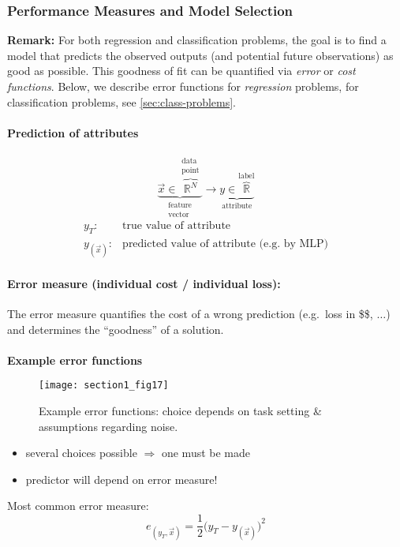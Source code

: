 \subsubsection{Performance Measures and Model
  Selection} \label{sec:perf-meas-model} \textbf{Remark:} For both
regression and classification problems, the goal is to find a model
that predicts the observed outputs (and potential future observations)
as good as possible. This goodness of fit can be quantified via
\emph{error} or \emph{cost functions}. Below, we describe error
functions for \emph{regression} problems, for classification problems,
see \ref{sec:class-problems}.


\paragraph{Prediction of attributes}
\[ \underbrace{\vec{x} \in \overbrace{\mathbb{R}^N}^{
	\substack{\text{data} \\ \text{point}}}
	}_{\substack{\text{feature} \\ \text{vector}}}
   \longrightarrow 
   \underbrace{y \in \overbrace{\mathbb{R}}^{\text{label}}
	}_{\text{attribute}}
\]
\[ \begin{array}{ll}
	y_T: & \text{true value of attribute} \\
	y_{(\vec{x})}: & \text{predicted value of attribute (e.g. by MLP)}
\end{array} \]

\paragraph{Error measure (individual cost / individual loss):}
The error measure quantifies the cost of a wrong prediction (e.g.\ loss in \$\$, $\ldots$) and determines the ``goodness'' of a solution.
\\\\
\textbf{Example error functions}
\begin{figure}[h]
  \centering
\texttt{[image: section1\_fig17]}   
  \caption{Example error functions: choice depends on task setting \& assumptions regarding noise.}
\end{figure}

\begin{itemize}
	\item several choices possible $\Rightarrow$ one must be made
	\item predictor will depend on error measure!
\end{itemize}
Most common error measure: 
\begin{equation} \tag{quadratic error}
	e_{(y_T, \vec{x})} = \frac{1}{2} \big( y_T - y_{(\vec{x})} \big)^2
\end{equation}
\vspace{2mm}

